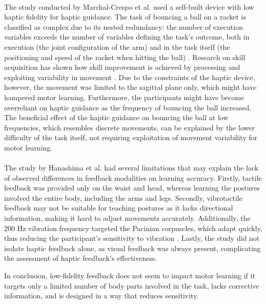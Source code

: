 \paragraph{}
The study conducted by Marchal-Crespo et al. used a self-built device with low haptic fidelity for haptic guidance. The task of bouncing a ball on a racket is classified as complex due to its nested redundancy: the number of execution variables exceeds the number of variables defining the task's outcome, both in execution (the joint configuration of the arm) and in the task itself (the positioning and speed of the racket when hitting the ball) \cite{Levac2019LearningReview}. Research on skill acquisition has shown how skill improvement is achieved by processing and exploiting variability in movement \cite{Sternad2018ItsLearning}. Due to the constraints of the haptic device, however, the movement was limited to the sagittal plane only, which might have hampered motor learning. Furthermore, the participants might have become overreliant on haptic guidance as the frequency of bouncing the ball increased. The beneficial effect of the haptic guidance on bouncing the ball at low frequencies, which resembles discrete movements, can be explained by the lower difficulty of the task itself, not requiring exploitation of movement variability for motor learning.

\paragraph{}
The study by Hanashima et al. had several limitations that may explain the lack of observed differences in feedback modalities on learning accuracy. Firstly, tactile feedback was provided only on the waist and head, whereas learning the postures involved the entire body, including the arms and legs. Secondly, vibrotactile feedback may not be suitable for teaching postures as it lacks directional information, making it hard to adjust movements accurately. Additionally, the 200 Hz vibration frequency targeted the Pacinian corpuscles, which adapt quickly, thus reducing the participant's sensitivity to vibration \cite{Hanashima2023}. Lastly, the study did not isolate haptic feedback alone, as visual feedback was always present, complicating the assessment of haptic feedback's effectiveness.

In conclusion, low-fidelity feedback does not seem to impact motor learning if it targets only a limited number of body parts involved in the task, lacks corrective information, and is designed in a way that reduces sensitivity.


